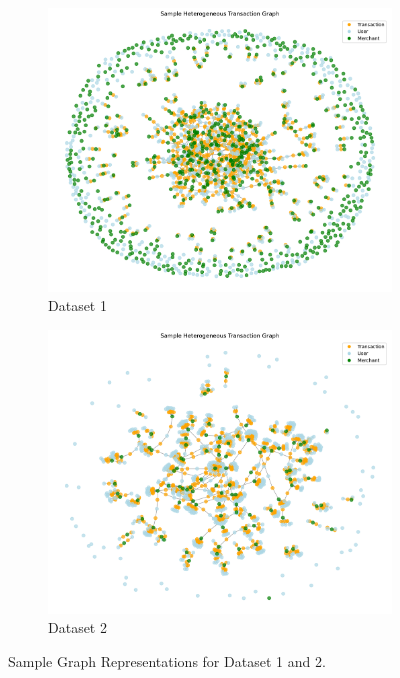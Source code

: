 \documentclass[conference]{IEEEtran}
\begin{document}
\begin{figure}[htbp]
    \centering
    \begin{subfigure}{0.45\columnwidth}
        \centering
        \includegraphics[width=\linewidth]{Graph DS1.pdf}
        \caption{Dataset 1}
        \label{fig:graph-ds1}
    \end{subfigure}
    \hfill
    \begin{subfigure}{0.45\columnwidth}
        \centering
        \includegraphics[width=\linewidth]{Graph DS2.pdf}
        \caption{Dataset 2}
        \label{fig:graph-ds2}
    \end{subfigure}
    
    \caption{Sample Graph Representations for Dataset 1 and 2.}
    \label{fig:graph-datasets}
\end{figure}
\end{document}
